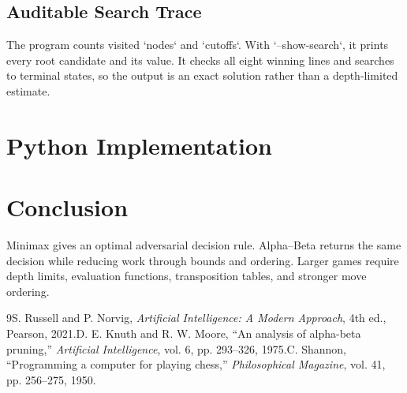 \documentclass[conference]{IEEEtran}
\begin{document}
\subsection{Auditable Search Trace}The program counts visited `nodes` and `cutoffs`. With `--show-search`, it prints every root candidate and its value. It checks all eight winning lines and searches to terminal states, so the output is an exact solution rather than a depth-limited estimate.\section{Python Implementation}
\section{Conclusion}Minimax gives an optimal adversarial decision rule. Alpha--Beta returns the same decision while reducing work through bounds and ordering. Larger games require depth limits, evaluation functions, transposition tables, and stronger move ordering.\begin{thebibliography}{9}S. Russell and P. Norvig, \emph{Artificial Intelligence: A Modern Approach}, 4th ed., Pearson, 2021.D. E. Knuth and R. W. Moore, ``An analysis of alpha-beta pruning,'' \emph{Artificial Intelligence}, vol. 6, pp. 293--326, 1975.C. Shannon, ``Programming a computer for playing chess,'' \emph{Philosophical Magazine}, vol. 41, pp. 256--275, 1950.\end{thebibliography}
\end{document}

